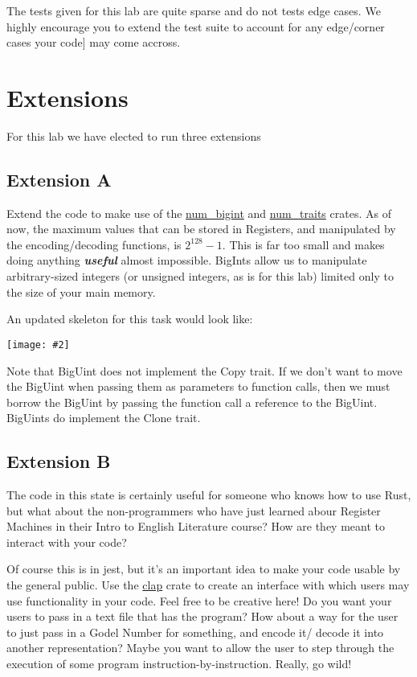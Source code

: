 \documentclass{report}
\newcommand{\centerimg}[2]{\begin{center}\texttt{[image: \#2]}\end{center}}
\begin{document}
The tests given for this lab are quite sparse and do not tests edge cases. We highly
encourage you to extend the test suite to account for any edge/corner cases your code]
may come accross.

\section*{Extensions}

For this lab we have elected to run three extensions
\subsection*{Extension A} 
Extend the code to make use of the \href{https://docs.rs/num-bigint/latest/num_bigint}{num\_bigint} and 
\href{https://docs.rs/num-traits/latest/num_traits}{num\_traits} crates.
As of now, the maximum values that can be stored in Registers, and manipulated by
the encoding/decoding functions, is $2^{128}-1$. This is far too small and makes doing anything
\textbf{\textit{useful}} almost impossible. BigInts allow us to manipulate arbitrary-sized
integers (or unsigned integers, as is for this lab) limited only to the size of your
main memory.

An updated skeleton for this task would look like:
\centerimg{width=\textwidth}{BigUInt}
Note that BigUint does not implement the Copy trait. If we don't want to move the BigUint when
passing them as parameters to function calls, then we must borrow the BigUint by passing
the function call a reference to the BigUint. BigUints do implement the Clone trait.

\subsection*{Extension B}
The code in this state is certainly useful for someone who knows how to use Rust,
but what about the non-programmers who have just learned abour Register Machines in
their Intro to English Literature course? How are they meant to interact with your 
code?

Of course this is in jest, but it's an important idea to make your code usable by
the general public.
Use the \href{https://github.com/clap-rs/clap}{clap} crate to create an interface
with which users may use functionality in your code. Feel free to be creative here!
Do you want your users to pass in a text file that has the program? How about a way
for the user to just pass in a Godel Number for something, and encode it/
decode it into another representation? Maybe you want to allow the user to step 
through the execution of some program instruction-by-instruction. Really, go wild!
\end{document}
